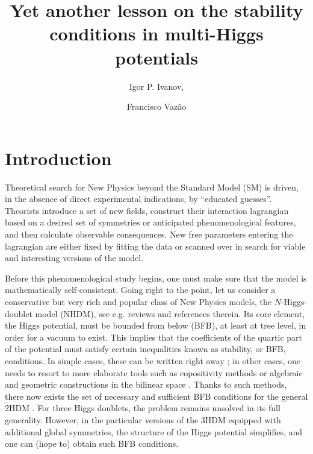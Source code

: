 \documentclass[11pt]{article}
\title{
		Yet another lesson on the stability conditions in multi-Higgs potentials}
\author{Igor P. Ivanov,}
\author{Francisco Vaz\~{a}o}
\affiliation{Centro de Física Teórica de Particulas, Departamento de Física, Instituto Superior Técnico, Universidade de Lisboa, Lisboa}
\begin{document}
	\maketitle

\section{Introduction}

Theoretical search for New Physics beyond the Standard Model (SM) is driven, in the absence of direct experimental indications, by ``educated guesses''. Theorists introduce a set of new fields, construct their interaction lagrangian based on a desired set of symmetries or anticipated phenomenological features, and then calculate observable consequences. New free parameters entering the lagrangian are either fixed by fitting the data or scanned over in search for viable and interesting versions of the model.

Before this phenomenological study begins, one must make sure that the model is mathematically self-consistent.
Going right to the point, let us consider a conservative but very rich and popular class of New Physics models, 
the $N$-Higgs-doublet model (NHDM), see e.g. reviews \cite{Branco:2011iw,Ivanov:2017dad} and references therein.
Its core element, the Higgs potential, must be bounded from below (BFB), at least at tree level, 
in order for a vacuum to exist. This implies that the coefficients of the quartic part of the potential
must satisfy certain inequalities known as stability, or BFB, conditions.
In simple cases, these can be written right away \cite{Branco:2011iw}; 
in other cases, one needs to resort to more elaborate tools such as copositivity methods \cite{Kannike:2012pe,Kannike:2016fmd}
or algebraic and geometric constructions in the bilinear space \cite{Nagel:PhD,Ivanov:2005hg,Nishi:2006tg,Maniatis:2006fs,Ivanov:2006yq,Nishi:2007nh,Ivanov:2010ww,Ivanov:2010wz,Maniatis:2014oza,Maniatis:2015gma}. 
Thanks to such methods, there now exists the set of necessary and sufficient BFB conditions for the general 2HDM \cite{Ivanov:2006yq}.
For three Higgs doublets, the problem remains unsolved in its full generality.
However, in the particular versions of the 3HDM equipped with additional global symmetries,
the structure of the Higgs potential simplifies, and one can (hope to) obtain such BFB conditions.
\end{document}
